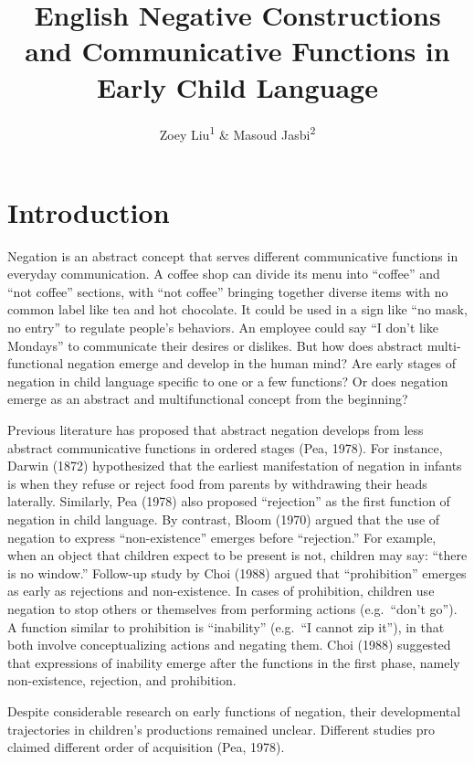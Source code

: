 \documentclass[
  english,
  man,floatsintext]{apa6}
\title{English Negative Constructions and Communicative Functions in Early Child Language}
\author{Zoey Liu\textsuperscript{1} \& Masoud Jasbi\textsuperscript{2}}
\date{}
\affiliation{\vspace{0.5cm}\textsuperscript{1} Boston College\\\textsuperscript{2} UC Davis}
\begin{document}
\maketitle

\hypertarget{introduction}{%
\section{Introduction}\label{introduction}}

Negation is an abstract concept that serves different communicative functions in everyday communication. A coffee shop can divide its menu into ``coffee'' and ``not coffee'' sections, with ``not coffee'' bringing together diverse items with no common label like tea and hot chocolate. It could be used in a sign like ``no mask, no entry'' to regulate people's behaviors. An employee could say ``I don't like Mondays'' to communicate their desires or dislikes. But how does abstract multi-functional negation emerge and develop in the human mind? Are early stages of negation in child language specific to one or a few functions? Or does negation emerge as an abstract and multifunctional concept from the beginning?

Previous literature has proposed that abstract negation develops from less abstract communicative functions in ordered stages (Pea, 1978). For instance, Darwin (1872) hypothesized that the earliest manifestation of negation in infants is when they refuse or reject food from parents by withdrawing their heads laterally. Similarly, Pea (1978) also proposed ``rejection'' as the first function of negation in child language. By contrast, Bloom (1970) argued that the use of negation to express ``non-existence'' emerges before ``rejection.'' For example, when an object that children expect to be present is not, children may say: ``there is no window.'' Follow-up study by Choi (1988) argued that ``prohibition'' emerges as early as rejections and non-existence. In cases of prohibition, children use negation to stop others or themselves from performing actions (e.g.~``don't go''). A function similar to prohibition is ``inability'' (e.g.~``I cannot zip it''), in that both involve conceptualizing actions and negating them. Choi (1988) suggested that expressions of inability emerge after the functions in the first phase, namely non-existence, rejection, and prohibition.

Despite considerable research on early functions of negation, their developmental trajectories in children's productions remained unclear. Different studies pro claimed different order of acquisition (Pea, 1978).
\end{document}
